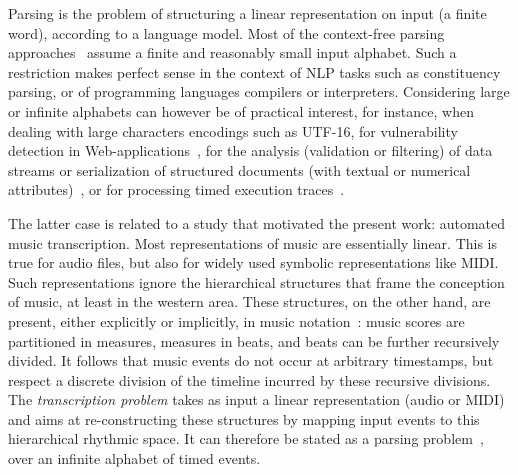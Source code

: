 %
Parsing %
is the problem %
of structuring a linear representation on input %
(a finite word), according to a language model. %
%
Most of the context-free parsing approaches~\cite{GruneJacobs08parsing}
assume a finite and reasonably small input alphabet. %
Such a restriction makes perfect sense in the context of
NLP tasks such as constituency parsing,
or of programming languages compilers or interpreters.
Considering large or infinite alphabets can however be of
practical interest, %
%
for instance, when dealing with large characters encodings such as UTF-16, %
\eg for vulnerability detection in Web-applications~\cite{dAntoni21CACM},
%
for the analysis (\eg validation or filtering)
of data streams or serialization of structured documents
(with textual or numerical attributes)~\cite{Segoufin06csl},
or for processing timed execution traces~\cite{Bouyer03algebraic}.
%

The latter case is related to a study that motivated the present work:
automated music transcription. Most representations of music are
essentially linear. This is true for audio files,
but also for widely used symbolic representations like MIDI.
Such representations ignore the hierarchical structures that frame the
conception of music, at least in the western area. These structures, on the other hand,
are present, either explicitly  or implicitly,
in music notation~\cite{Gould11Notation}: music scores are partitioned in measures, measures
in beats, and beats can be further recursively divided.
It follows that music events do not occur at arbitrary timestamps,
but respect a discrete division of the  timeline incurred by
these recursive divisions.
The \emph{transcription problem} takes
as input a linear representation (audio or MIDI) and aims at re-constructing
these structures
by mapping input events to this hierarchical rhythmic space.
It can therefore be stated as a parsing problem~\cite{foscarin:hal-01988990},
over an infinite alphabet of timed events.

